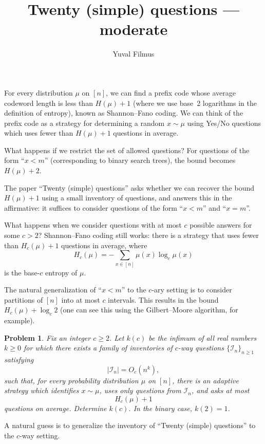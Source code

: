 \documentclass[10pt]{article}
\title{Twenty (simple) questions --- moderate}
\author{Yuval Filmus}
\date{}
\newtheorem{problem}{Problem}
\begin{document}
\maketitle

For every distribution $\mu$ on $[n]$, we can find a prefix code whose average codeword length is less than $H(\mu) + 1$ (where we use base~2 logarithms in the definition of entropy), known as Shannon--Fano coding. We can think of the prefix code as a strategy for determining a random $x \sim \mu$ using Yes/No questions which uses fewer than $H(\mu) + 1$ questions in average.

What happens if we restrict the set of allowed questions? For questions of the form ``$x < m$'' (corresponding to binary search trees), the bound becomes $H(\mu) + 2$.

The paper ``Twenty (simple) questions'' asks whether we can recover the bound $H(\mu) + 1$ using a small inventory of questions, and answers this in the affirmative: it suffices to consider questions of the form ``$x < m$'' and ``$x = m$''.

What happens when we consider questions with at most $c$ possible answers for some $c > 2$? Shannon--Fano coding still works: there is a strategy that uses fewer than $H_c(\mu) + 1$ questions in average, where
\[
H_c(\mu)=-\sum_{x\in[n]}\mu(x)\log_c\mu(x)
\]
is the base-$c$ entropy of $\mu$.

The natural generalization of ``$x < m$'' to the $c$-ary setting is to consider partitions of $[n]$ into at most $c$ intervals. This results in the bound $H_c(\mu) + \log_c 2$ (one can see this using the Gilbert--Moore algorithm, for example).

\begin{problem}
Fix an integer $c\geq 2$. Let $k(c)$ be the infimum of all real numbers $k\geq 0$ for which there exists a family of inventories of $c$-way questions $\{\mathcal{I}_n\}_{n\geq 1}$ satisfying
\[
    |\mathcal{I}_n|=O_c(n^k),
\]
such that, for every probability distribution $\mu$ on $[n]$, there is an adaptive strategy which identifies $x\sim\mu$, uses only questions from $\mathcal{I}_n$, and asks at most
\[
    H_c(\mu)+1
\]
questions on average. Determine $k(c)$. In the binary case, $k(2)=1$.
\end{problem}

A natural guess is to generalize the inventory of ``Twenty (simple) questions'' to the $c$-way setting.
\end{document}
